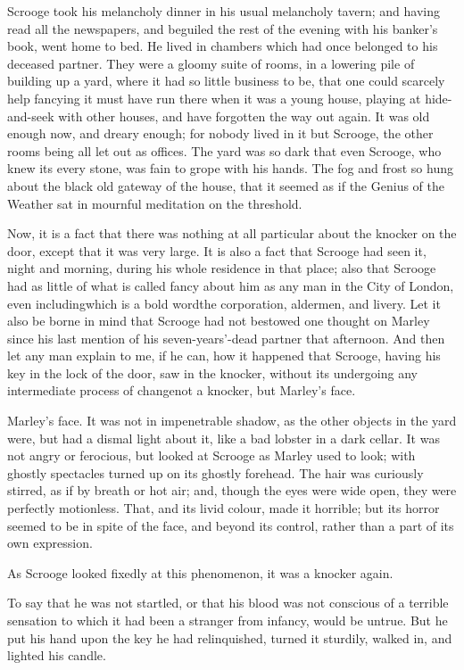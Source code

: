 \documentclass[paper=5.5in:8.5in,BCOR=10mm,twoside,DIV=15,12pt,usegeometry,openany]{scrbook} %
\begin{document}
Scrooge took his melancholy dinner in his usual melancholy tavern; and having read all the newspapers, and beguiled the rest of the evening with his banker's book, went home to bed. He lived in chambers which had once belonged to his deceased partner. They were a gloomy suite of rooms, in a lowering pile of building up a yard, where it had so little business to be, that one could scarcely help fancying it must have run there when it was a young house, playing at hide-and-seek with other houses, and have forgotten the way out again. It was old enough now, and dreary enough; for nobody lived in it but Scrooge, the other rooms being all let out as offices. The yard was so dark that even Scrooge, who knew its every stone, was fain to grope with his hands. The fog and frost so hung about the black old gateway of the house, that it seemed as if the Genius of the Weather sat in mournful meditation on the threshold.

Now, it is a fact that there was nothing at all particular about the knocker on the door, except that it was very large. It is also a fact that Scrooge had seen it, night and morning, during his whole residence in that place; also that Scrooge had as little of what is called fancy about him as any man in the City of London, even including\textemdash which is a bold word\textemdash the corporation, aldermen, and livery. Let it also be borne in mind that Scrooge had not bestowed one thought on Marley since his last mention of his seven-years'-dead partner that afternoon. And then let any man explain to me, if he can, how it happened that Scrooge, having his key in the lock of the door, saw in the knocker, without its undergoing any intermediate process of change\textemdash not a knocker, but Marley's face.

Marley's face. It was not in impenetrable shadow, as the other objects in the yard were, but had a dismal light about it, like a bad lobster in a dark cellar. It was not angry or ferocious, but looked at Scrooge as Marley used to look; with ghostly spectacles turned up on its ghostly forehead. The hair was curiously stirred, as if by breath or hot air; and, though the eyes were wide open, they were perfectly motionless. That, and its livid colour, made it horrible; but its horror seemed to be in spite of the face, and beyond its control, rather than a part of its own expression.

As Scrooge looked fixedly at this phenomenon, it was a knocker again.

To say that he was not startled, or that his blood was not conscious of a terrible sensation to which it had been a stranger from infancy, would be untrue. But he put his hand upon the key he had relinquished, turned it sturdily, walked in, and lighted his candle.
\end{document}
